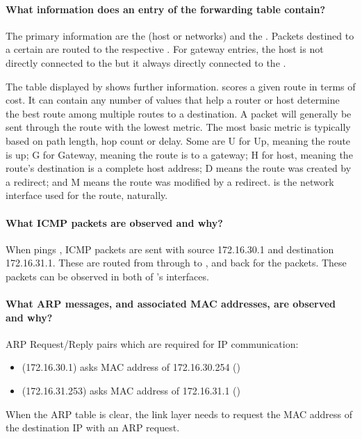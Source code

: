 \documentclass[compilation.tex]{subfiles}
\begin{document}
\paragraph{What information does an entry of the forwarding table contain?}
The primary information are the  (host or networks) and the . Packets destined to a certain  are routed to the respective . For gateway entries, the host is not directly connected to the  but it always directly connected to the .

The table displayed by  shows further information.  scores a given route in terms of cost. It can contain any number of values that help a router or host determine the best route among multiple routes to a destination. A packet will generally be sent through the route with the lowest metric. The most basic metric is typically based on path length, hop count or delay. Some  are U for Up, meaning the route is up; G for Gateway, meaning the route is to a gateway; H for host, meaning the route's destination is a complete host address; D means the route was created by a redirect; and M means the route was modified by a redirect.  is the network interface used for the route, naturally.

\paragraph{What ICMP packets are observed and why?}
When  pings , ICMP  packets are sent with source 172.16.30.1 and destination 172.16.31.1. These are routed from  through  to , and back for the  packets. These packets can be observed in both of 's interfaces.

\paragraph{What ARP messages, and associated MAC addresses, are observed and why?}
ARP Request/Reply pairs which are required for IP communication:
\begin{itemize}[noitemsep,leftmargin=*,topsep=0pt]
\item {} (172.16.30.1) asks MAC address of 172.16.30.254 ()
\item {} (172.16.31.253) asks MAC address of 172.16.31.1 ()
\end{itemize}
When the ARP table is clear, the link layer needs to request the MAC address of the destination IP with an ARP request.
\end{document}
